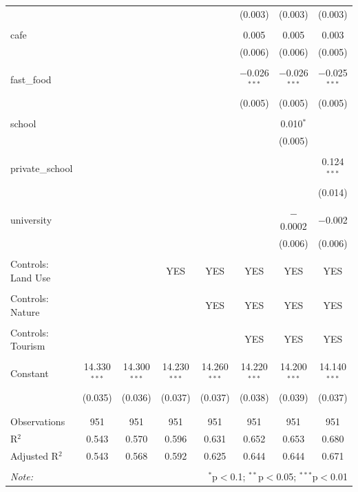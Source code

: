 \documentclass{article}
\begin{document}
\begin{table}[t]
\begin{tabular}{@{\extracolsep{-10pt}}lccccccc}
  &  &  &  &  & (0.003) & (0.003) & (0.003) \\ 
  & & & & & & & \\ 
 cafe &  &  &  &  & 0.005 & 0.005 & 0.003 \\ 
  &  &  &  &  & (0.006) & (0.006) & (0.005) \\ 
  & & & & & & & \\ 
 fast\_food &  &  &  &  & $-$0.026$^{***}$ & $-$0.026$^{***}$ & $-$0.025$^{***}$ \\ 
  &  &  &  &  & (0.005) & (0.005) & (0.005) \\ 
  & & & & & & & \\ 
 school &  &  &  &  &  & 0.010$^{*}$ &  \\ 
  &  &  &  &  &  & (0.005) &  \\ 
  & & & & & & & \\ 
 private\_school &  &  &  &  &  &  & 0.124$^{***}$ \\ 
  &  &  &  &  &  &  & (0.014) \\ 
  & & & & & & & \\ 
 university &  &  &  &  &  & $-$0.0002 & $-$0.002 \\ 
  &  &  &  &  &  & (0.006) & (0.006) \\ 
  & & & & & & & \\ 
 Controls: Land Use &  &  & YES  & YES  & YES &  YES & YES \\ 
  &  &  &  &  &  &  & \\ 
 Controls: Nature &  &  &   & YES  & YES & YES & YES \\ 
  &  &  &  &  &  &  &  \\ 
 Controls: Tourism &  &  &  &  & YES & YES & YES  \\ 
  &  &  &  &  &  &  & \\ 
 Constant & 14.330$^{***}$ & 14.300$^{***}$ & 14.230$^{***}$ & 14.260$^{***}$ & 14.220$^{***}$ & 14.200$^{***}$ & 14.140$^{***}$ \\ 
  & (0.035) & (0.036) & (0.037) & (0.037) & (0.038) & (0.039) & (0.037) \\ 
  & & & & & & & \\ 
\hline \\[-1.8ex] 
Observations & 951 & 951 & 951 & 951 & 951 & 951 & 951 \\ 
R$^{2}$ & 0.543 & 0.570 & 0.596 & 0.631 & 0.652 & 0.653 & 0.680 \\ 
Adjusted R$^{2}$ & 0.543 & 0.568 & 0.592 & 0.625 & 0.644 & 0.644 & 0.671 \\ 
\hline 
\hline \\[-1.8ex] 
\textit{Note:}  & \multicolumn{7}{r}{$^{*}$p$<$0.1; $^{**}$p$<$0.05; $^{***}$p$<$0.01} \\ 
\end{tabular}
\end{table}
\end{document}
